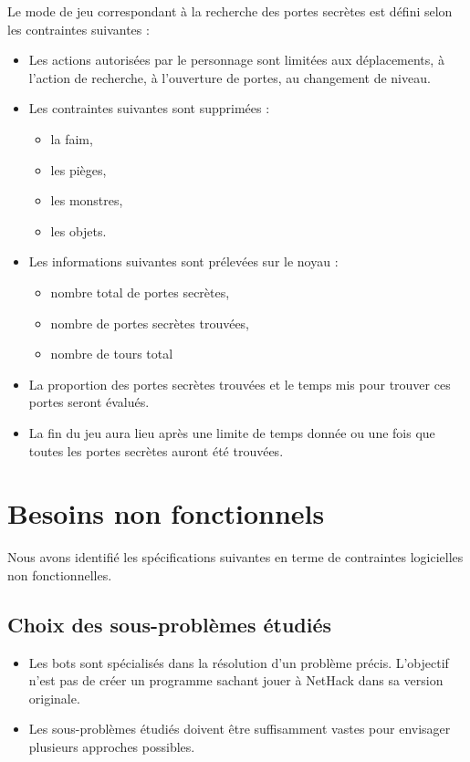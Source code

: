 \documentclass[12pt]{article}
\begin{document}
Le mode de jeu correspondant à la recherche des portes secrètes est défini selon les contraintes suivantes : 
\begin{itemize}
	\item Les actions autorisées par le personnage sont limitées aux déplacements, à l'action de recherche, à l'ouverture de portes, au changement de niveau. 
	\item Les contraintes suivantes sont supprimées : 
	\begin{itemize}
		\item la faim, 
		\item les pièges, 
		\item les monstres, 
		\item les objets. 
	\end{itemize}
	\item Les informations suivantes sont prélevées sur le noyau :
	\begin{itemize}
		\item nombre total de portes secrètes, 
		\item nombre de portes secrètes trouvées, 
		\item nombre de tours total 
	\end{itemize}
	\item La proportion des portes secrètes trouvées et le temps mis pour trouver ces portes seront évalués. 
	\item La fin du jeu aura lieu après une limite de temps donnée ou une fois que toutes les portes secrètes auront été trouvées.
\end{itemize}


\section{Besoins non fonctionnels}

Nous avons identifié les spécifications suivantes en terme de contraintes logicielles non fonctionnelles.

\subsection{Choix des sous-problèmes étudiés}

\begin{itemize}
	\item Les bots sont spécialisés dans la résolution d'un problème précis.  L'objectif n'est pas de créer un programme sachant jouer à NetHack dans sa version originale.
	\item Les sous-problèmes étudiés doivent être suffisamment vastes pour envisager plusieurs approches possibles.
\end{itemize}
\end{document}
